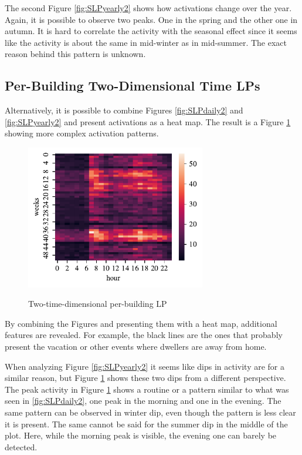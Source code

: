 The second Figure \ref{fig:SLPyearly2} shows how activations change over the year.  
Again, it is possible to observe two peaks.
One in the spring and the other one in autumn. 
It is hard to correlate the activity with the seasonal effect since it seems like the activity is about the same in mid-winter as in mid-summer. 
The exact reason behind this pattern is unknown.

\subsection{Per-Building Two-Dimensional Time LPs}
\label{ssec:per_building_two_time_dim}
Alternatively, it is possible to combine Figures \ref{fig:SLPdaily2} and \ref{fig:SLPyearly2} and present activations as a heat map.
The result is a Figure \ref{fig:SLPHMyearly2} showing more complex activation patterns.

\begin{figure}[H]
	\centering
	\caption{Two-time-dimensional per-building LP}
	\includegraphics[width=0.7\textwidth]{../Figures/LPS/SLPHMyearly2.pdf}
	\label{fig:SLPHMyearly2}
\end{figure}


By combining the Figures and presenting them with a heat map, additional features are revealed.
For example, the black lines are the ones that probably present the vacation or other events where dwellers are away from home.

When analyzing Figure \ref{fig:SLPyearly2} it seems like dips in activity are for a similar reason, but Figure \ref{fig:SLPHMyearly2} shows these two dips from a different perspective.
The peak activity in Figure \ref{fig:SLPHMyearly2} shows a routine or a pattern similar to what was seen in \ref{fig:SLPdaily2}, one peak in the morning and one in the evening. 
The same pattern can be observed in winter dip, even though the pattern is less clear it is present.
The same cannot be said for the summer dip in the middle of the plot. 
Here, while the morning peak is visible, the evening one can barely be detected.

